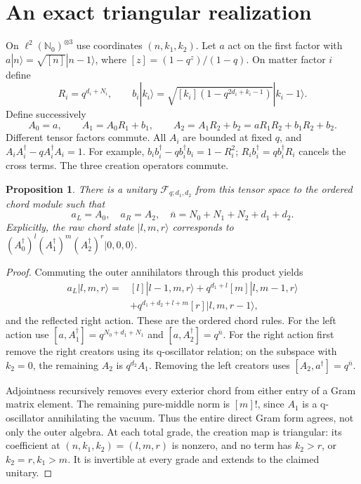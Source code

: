 \documentclass[11pt]{article}
\newtheorem{proposition}{Proposition}
\newcommand{\ket}[1]{|#1\rangle}
\begin{document}
\newpage
\section{An exact triangular realization}
On $\ell^2(\mathbb N_0)^{\otimes3}$ use coordinates $(n,k_1,k_2)$.
Let $a$ act on the first factor with
$a\ket n=\sqrt{[n]}\ket{n-1}$, where $[z]=(1-q^z)/(1-q)$.
On matter factor $i$ define
\begin{equation}
 R_i=q^{d_i+N_i},\qquad
 b_i\ket{k_i}=\sqrt{[k_i](1-q^{2d_i+k_i-1})}\ket{k_i-1}.
 \label{b}
\end{equation}
Define successively
\begin{equation}
 A_0=a,\qquad A_1=A_0R_1+b_1,\qquad
 A_2=A_1R_2+b_2=aR_1R_2+b_1R_2+b_2.
 \label{triangle}
\end{equation}
Different tensor factors commute. All $A_i$ are bounded at
fixed $q$, and $A_iA_i^\dagger-qA_i^\dagger A_i=1$.
For example, $b_ib_i^\dagger-qb_i^\dagger b_i=1-R_i^2$;
$R_ib_i^\dagger=qb_i^\dagger R_i$ cancels the cross terms.
The three creation operators commute.

\begin{proposition}\label{isometry}
There is a unitary $\mathcal F_{q;d_1,d_2}$ from this tensor
space to the ordered chord module such that
\begin{equation}
 a_L=A_0,\quad a_R=A_2,\quad
 \bar n=N_0+N_1+N_2+d_1+d_2.\label{outer}
\end{equation}
Explicitly, the raw chord state $\ket{l,m,r}$ corresponds to
$(A_0^\dagger)^l(A_1^\dagger)^m(A_2^\dagger)^r\ket{0,0,0}$.
\end{proposition}
\begin{proof}
Commuting the outer annihilators through this product yields
\begin{align}
 a_L\ket{l,m,r}={}&[l]\ket{l-1,m,r}
 +q^{d_1+l}[m]\ket{l,m-1,r}\nonumber\\
 &+q^{d_1+d_2+l+m}[r]\ket{l,m,r-1},\label{lower}
\end{align}
and the reflected right action. These are the ordered chord
rules. For the left action use
$[a,A_1^\dagger]=q^{N_0+d_1+N_1}$ and
$[a,A_2^\dagger]=q^{\bar n}$. For the right action first
remove the right creators using its q-oscillator relation;
on the subspace with $k_2=0$, the remaining $A_2$ is
$q^{d_2}A_1$. Removing the left creators uses
$[A_2,a^\dagger]=q^{\bar n}$.

Adjointness recursively removes every exterior chord from
either entry of a Gram matrix element. The remaining
pure-middle norm is $[m]!$, since $A_1$ is a q-oscillator
annihilating the vacuum. Thus the entire direct Gram form
agrees, not only the outer algebra. At each total grade,
the creation map is triangular: its coefficient at
$(n,k_1,k_2)=(l,m,r)$ is nonzero, and no term has $k_2>r$,
or $k_2=r,k_1>m$. It is invertible at every grade and
extends to the claimed unitary.
\end{proof}
\end{document}
